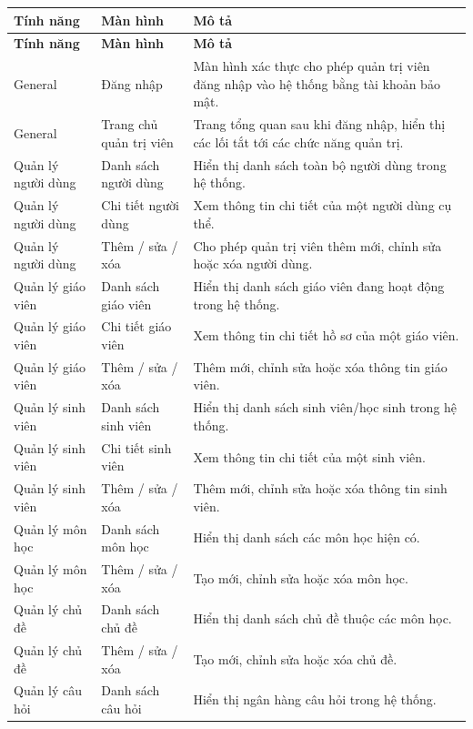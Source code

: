 \documentclass[12pt,a4paper,oneside]{report}
\begin{document}
\renewcommand{\arraystretch}{1.12}
\begin{longtable}{|p{3.0cm}|p{4.1cm}|p{7.0cm}|}
\hline
\rowcolor{orange!15}
\textbf{Tính năng} & \textbf{Màn hình} & \textbf{Mô tả} \\ \hline
\endfirsthead
\hline
\rowcolor{orange!15}
\textbf{Tính năng} & \textbf{Màn hình} & \textbf{Mô tả} \\ \hline
\endhead
General & Đăng nhập & Màn hình xác thực cho phép quản trị viên đăng nhập vào hệ thống bằng tài khoản bảo mật. \\ \hline
General & Trang chủ quản trị viên & Trang tổng quan sau khi đăng nhập, hiển thị các lối tắt tới các chức năng quản trị. \\ \hline
Quản lý người dùng & Danh sách người dùng & Hiển thị danh sách toàn bộ người dùng trong hệ thống. \\ \hline
Quản lý người dùng & Chi tiết người dùng & Xem thông tin chi tiết của một người dùng cụ thể. \\ \hline
Quản lý người dùng & Thêm / sửa / xóa & Cho phép quản trị viên thêm mới, chỉnh sửa hoặc xóa người dùng. \\ \hline
Quản lý giáo viên & Danh sách giáo viên & Hiển thị danh sách giáo viên đang hoạt động trong hệ thống. \\ \hline
Quản lý giáo viên & Chi tiết giáo viên & Xem thông tin chi tiết hồ sơ của một giáo viên. \\ \hline
Quản lý giáo viên & Thêm / sửa / xóa & Thêm mới, chỉnh sửa hoặc xóa thông tin giáo viên. \\ \hline
Quản lý sinh viên & Danh sách sinh viên & Hiển thị danh sách sinh viên/học sinh trong hệ thống. \\ \hline
Quản lý sinh viên & Chi tiết sinh viên & Xem thông tin chi tiết của một sinh viên. \\ \hline
Quản lý sinh viên & Thêm / sửa / xóa & Thêm mới, chỉnh sửa hoặc xóa thông tin sinh viên. \\ \hline
Quản lý môn học & Danh sách môn học & Hiển thị danh sách các môn học hiện có. \\ \hline
Quản lý môn học & Thêm / sửa / xóa & Tạo mới, chỉnh sửa hoặc xóa môn học. \\ \hline
Quản lý chủ đề & Danh sách chủ đề & Hiển thị danh sách chủ đề thuộc các môn học. \\ \hline
Quản lý chủ đề & Thêm / sửa / xóa & Tạo mới, chỉnh sửa hoặc xóa chủ đề. \\ \hline
Quản lý câu hỏi & Danh sách câu hỏi & Hiển thị ngân hàng câu hỏi trong hệ thống. \\ \hline

\end{longtable}
\end{document}
